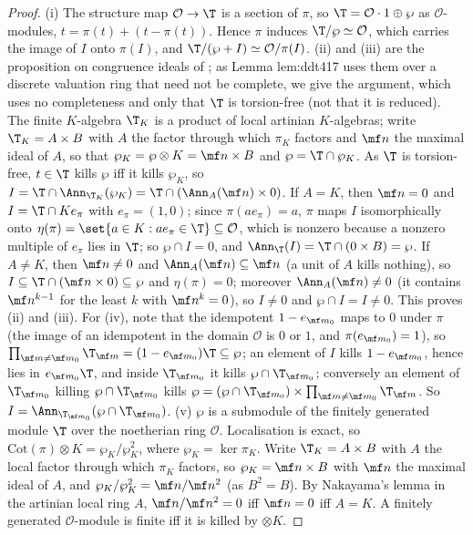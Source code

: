 \begin{proof}
(i) The structure map $\mathcal O\to\T$ is a section of $\pi$, so $\T=\mathcal O\cdot1\oplus\wp$ as $\mathcal O$-modules, $t=\pi(t)+(t-\pi(t))$. Hence $\pi$ induces $\T/\wp\simeq\mathcal O$, which carries
the image of $I$ onto $\pi(I)$, and $\T/(\wp+I)\simeq\mathcal O/\pi(I)$. (ii) and (iii) are the proposition on congruence ideals of ; as Lemma lem:ddt417 uses them over
a discrete valuation ring that need not be complete, we give the argument, which uses no completeness and only that $\T$ is torsion-free (not that it is reduced). The finite $K$-algebra
$\T_K$ is a product of local artinian $K$-algebras; write $\T_K=A\times B$ with $A$ the factor through which $\pi_K$ factors and $\mf n$ the maximal ideal of $A$, so that $\wp_K=\wp\otimes K=\mf n\times B$
and $\wp=\T\cap\wp_K$. As $\T$ is torsion-free, $t\in\T$ kills $\wp$ iff it kills $\wp_K$, so $I=\T\cap\Ann_{\T_K}(\wp_K)=\T\cap(\Ann_A(\mf n)\times0)$. If $A=K$, then $\mf n=0$ and $I=\T\cap Ke_\pi$ with
$e_\pi=(1,0)$; since $\pi(ae_\pi)=a$, $\pi$ maps $I$ isomorphically onto $\eta(\pi)=\set{a\in K:ae_\pi\in\T}\subseteq\mathcal O$, which is nonzero because a nonzero multiple of $e_\pi$ lies in $\T$; so
$\wp\cap I=0$, and $\Ann_\T(I)=\T\cap(0\times B)=\wp$. If $A\ne K$, then $\mf n\ne0$ and $\Ann_A(\mf n)\subseteq\mf n$ (a unit of $A$ kills nothing), so $I\subseteq\T\cap(\mf n\times0)\subseteq\wp$ and $\eta(\pi)=0$;
moreover $\Ann_A(\mf n)\ne0$ (it contains $\mf n^{k-1}$ for the least $k$ with $\mf n^k=0$), so $I\ne0$ and $\wp\cap I=I\ne0$. This proves (ii) and (iii). For (iv), note that
the idempotent $1-e_{\mf m_0}$ maps to $0$ under $\pi$ (the image of an idempotent in the domain $\mathcal O$ is $0$ or $1$, and $\pi(e_{\mf m_0})=1$), so $\prod_{\mf m\ne\mf m_0}\T_{\mf m}=(1-e_{\mf m_0})\T\subseteq\wp$; an
element of $I$ kills $1-e_{\mf m_0}$, hence lies in $e_{\mf m_0}\T$, and inside $\T_{\mf m_0}$ it kills $\wp\cap\T_{\mf m_0}$; conversely an element of $\T_{\mf m_0}$ killing $\wp\cap\T_{\mf m_0}$ kills
$\wp=(\wp\cap\T_{\mf m_0})\times\prod_{\mf m\ne\mf m_0}\T_{\mf m}$. So $I=\Ann_{\T_{\mf m_0}}(\wp\cap\T_{\mf m_0})$. (v) $\wp$ is a submodule of the finitely generated module $\T$ over the noetherian ring
$\mathcal O$. Localisation is exact, so $\mathrm{Cot}(\pi)\otimes K=\wp_K/\wp_K^2$, where $\wp_K=\ker\pi_K$. Write $\T_K=A\times B$ with $A$ the local factor through which $\pi_K$ factors, so
$\wp_K=\mf n\times B$ with $\mf n$ the maximal ideal of $A$, and $\wp_K/\wp_K^2=\mf n/\mf n^2$ (as $B^2=B$). By Nakayama's lemma in the artinian local ring $A$, $\mf n/\mf n^2=0$ iff $\mf n=0$ iff $A=K$.
A finitely generated $\mathcal O$-module is finite iff it is killed by $\otimes K$.
\end{proof}

